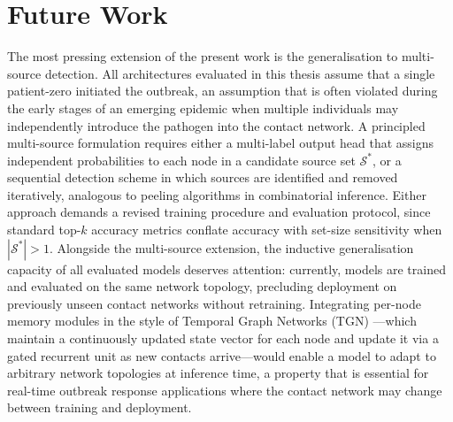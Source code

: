 \chapter{Future Work}
\label{c:futurework}

The most pressing extension of the present work is the generalisation to
multi-source detection. All architectures evaluated in this thesis assume that
a single patient-zero initiated the outbreak, an assumption that is often
violated during the early stages of an emerging epidemic when multiple
individuals may independently introduce the pathogen into the contact network.
A principled multi-source formulation requires either a multi-label output head
that assigns independent probabilities to each node in a candidate source set
$\mathcal{S}^*$, or a sequential detection scheme in which sources are
identified and removed iteratively, analogous to peeling algorithms in
combinatorial inference. Either approach demands a revised training procedure
and evaluation protocol, since standard top-$k$ accuracy metrics conflate
accuracy with set-size sensitivity when $|\mathcal{S}^*| > 1$. Alongside the
multi-source extension, the inductive generalisation capacity of all evaluated
models deserves attention: currently, models are trained and evaluated on the
same network topology, precluding deployment on previously unseen contact
networks without retraining. Integrating per-node memory modules in the style
of Temporal Graph Networks (TGN) \cite{Rossi2020}---which maintain a
continuously updated state vector for each node and update it via a gated
recurrent unit as new contacts arrive---would enable a model to adapt to
arbitrary network topologies at inference time, a property that is essential
for real-time outbreak response applications where the contact network may
change between training and deployment.

